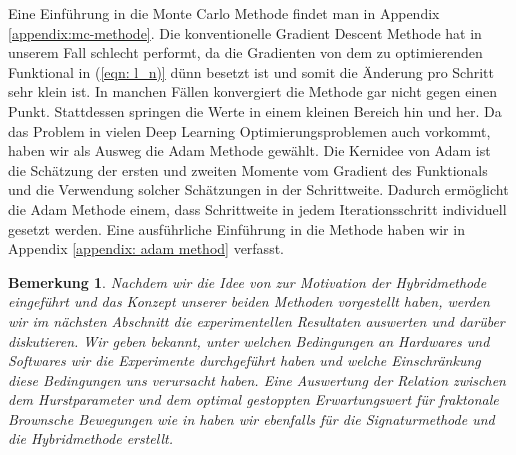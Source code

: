 \documentclass[12pt,titlepage,headsepline]{article}
\newtheorem*{bemerkung*}{Bemerkung}
\begin{document}
      Eine Einführung in die Monte Carlo Methode findet man in Appendix \ref{appendix:mc-methode}. Die konventionelle Gradient Descent Methode hat in unserem Fall schlecht performt, da die Gradienten von dem zu optimierenden Funktional in (\ref{eqn: l_n)} dünn besetzt ist und somit die Änderung pro Schritt sehr klein ist. In manchen Fällen konvergiert die Methode gar nicht gegen einen Punkt. Stattdessen springen die Werte in einem kleinen Bereich hin und her. Da das Problem in vielen Deep Learning Optimierungsproblemen auch vorkommt, haben wir als Ausweg die Adam Methode \cite{kingma_adam_2017} gewählt. Die Kernidee von Adam ist die Schätzung der ersten und zweiten Momente vom Gradient des Funktionals und die Verwendung solcher Schätzungen in der Schrittweite. Dadurch ermöglicht die Adam Methode einem, dass Schrittweite in jedem Iterationsschritt individuell gesetzt werden. Eine ausführliche Einführung in die Methode haben wir in Appendix \ref{appendix: adam method} verfasst.
      \begin{bemerkung*}
        \textup{
        Nachdem wir die Idee von \cite{becker_deep_2019} zur Motivation der Hybridmethode eingeführt und das Konzept unserer beiden Methoden vorgestellt haben, werden wir im nächsten Abschnitt die experimentellen Resultaten auswerten und darüber diskutieren. Wir geben bekannt, unter welchen Bedingungen an Hardwares und Softwares wir die Experimente durchgeführt haben und welche Einschränkung diese Bedingungen uns verursacht haben. Eine Auswertung der Relation zwischen dem Hurstparameter und dem optimal gestoppten Erwartungswert für fraktonale Brownsche Bewegungen wie in \cite{becker_deep_2019} haben wir ebenfalls für die Signaturmethode und die Hybridmethode erstellt.
        }
      \end{bemerkung*}

      \newpage
\end{document}
